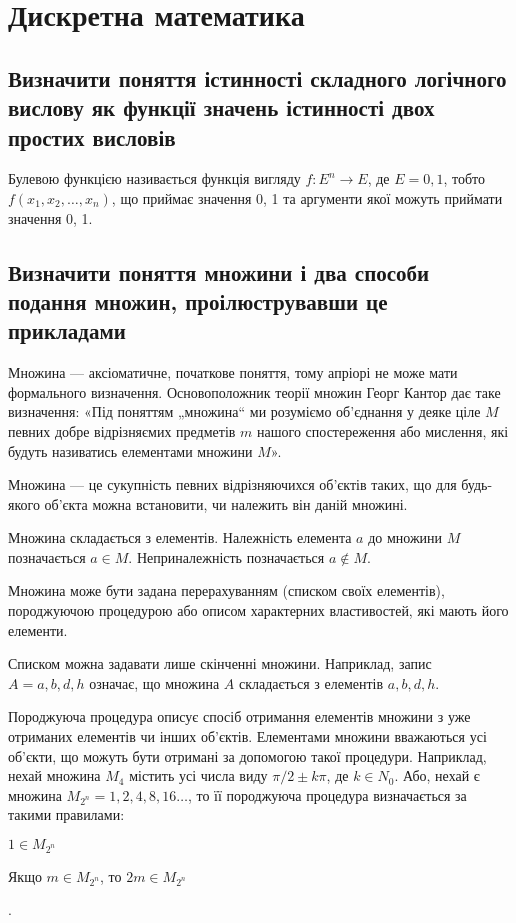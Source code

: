 \documentclass[a4paper,oneside,DIV=12,fontsize=12pt, headings=small]{scrartcl}
\begin{document}
	
	\section{Дискретна математика}
		\subsection{Визначити поняття істинності складного логічного вислову як функції значень істинності двох простих висловів}
			Булевою функцією називається функція вигляду $f : E^n \rightarrow E$, де $E = {0, 1}$, тобто $f(x_1, x_2, \dots, x_n)$, що приймає значення 0, 1 та аргументи якої можуть приймати значення 0, 1.
		
		\subsection{Визначити поняття множини і два способи подання множин, проілюструвавши це прикладами}
			Множина --- аксіоматичне, початкове поняття, тому апріорі не може мати формального визначення. Основоположник теорії множин Георг Кантор дає таке визначення: «Під поняттям „множина“ ми розуміємо об'єднання у деяке ціле $M$ певних добре відрізняємих предметів $m$ нашого спостереження або мислення, які будуть називатись елементами множини $M$».
		
			Множина --- це сукупність певних відрізняючихся об'єктів таких, що для будь-якого об'єкта можна встановити, чи належить він даній множині.
		
			Множина складається з елементів. Належність елемента $a$ до множини $M$ позначається $a \in M$. Неприналежність позначається $a \notin M$.
		
			Множина може бути задана перерахуванням (списком своїх елементів), породжуючою процедурою або описом характерних властивостей, які мають його елементи.
		
			Списком можна задавати лише скінченні множини. Наприклад, запис $A = {a, b, d, h}$ означає, що множина $A$ складається з елементів $a, b, d, h$.
		
			Породжуюча процедура описує спосіб отримання елементів множини з уже отриманих елементів чи інших об'єктів. Елементами множини вважаються усі об'єкти, що можуть бути отримані за допомогою такої процедури. Наприклад, нехай множина $M_4$ містить усі числа виду $\pi / 2 \pm k\pi$, де $k \in N_0$. Або, нехай є множина $M_{2^n} = {1, 2, 4, 8, 16 \dots}$, то її породжуюча процедура визначається за такими правилами:
			\begin{enumerate*}
				\item $1 \in M_{2^n}$
				\item Якщо $m \in M_{2^n}$, то $2m \in M_{2^n}$
			\end{enumerate*}.
		
\end{document}
